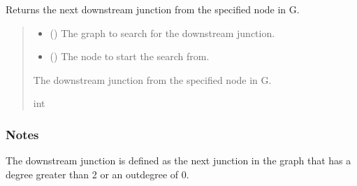 \documentclass[letterpaper,10pt,english]{sphinxmanual}
\begin{document}

\begin{fulllineitems}
\label{\detokenize{pysewer:pysewer.optimization.get_downstream_junction}}
\pysigstartsignatures
{}
\pysigstopsignatures
\sphinxAtStartPar
Returns the next downstream junction from the specified node in G.
\begin{quote}\begin{description}
\begin{itemize}
\item {} 
\sphinxAtStartPar
{} () \textendash{} The graph to search for the downstream junction.

\item {} 
\sphinxAtStartPar
{} () \textendash{} The node to start the search from.

\end{itemize}

\sphinxAtStartPar
The downstream junction from the specified node in G.

\sphinxAtStartPar
int

\end{description}\end{quote}
\subsubsection*{Notes}

\sphinxAtStartPar
The downstream junction is defined as the next junction in the graph that has a degree greater than 2 or an out\sphinxhyphen{}degree of 0.

\end{fulllineitems}

\end{document}
